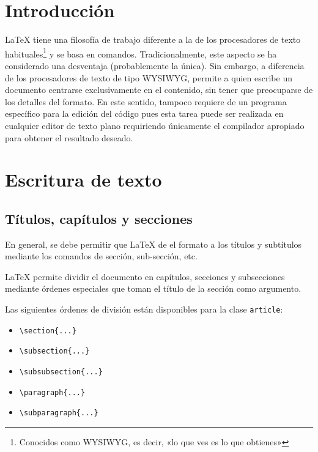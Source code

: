 \documentclass[a4,10pt]{aleph-notas}
\begin{document}
\encabezado

\informacion


\tableofcontents

\section{Introducción}

\LaTeX{} tiene una filosofía de trabajo diferente a la de los procesadores de texto habituales\footnote{Conocidos como \textsf{WYSIWYG}, es decir, «lo que ves es lo que obtienes»} y se basa en comandos. Tradicionalmente, este aspecto se ha considerado una desventaja (probablemente la única). Sin embargo, a diferencia de los procesadores de texto de tipo \textsf{WYSIWYG}, permite a quien escribe un documento centrarse exclusivamente en el contenido, sin tener que preocuparse de los detalles del formato. En este sentido, tampoco requiere de un programa específico para la edición del código pues esta tarea puede ser realizada en cualquier editor de texto plano requiriendo únicamente el compilador apropiado para obtener el resultado deseado.

\section{Escritura de texto}

\subsection{Títulos, capítulos y secciones}

\begin{advertencia}
En general, se debe permitir que \LaTeX{} de el formato a los títulos y subtítulos mediante los comandos de sección, sub-sección, etc.
\end{advertencia}

\LaTeX{} permite dividir el documento en capítulos, secciones y subsecciones mediante órdenes especiales que toman el título de la sección como argumento.

Las siguientes órdenes de división están disponibles para la clase \texttt{article}:
\begin{itemize}
\item \verb"\section{...}"
\item \verb"\subsection{...}"
\item \verb"\subsubsection{...}"
\item \verb"\paragraph{...}"
\item \verb"\subparagraph{...}"
\end{itemize}
\end{document}
